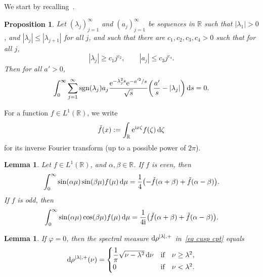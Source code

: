 \documentclass[pdftex]{sigma}%
\numberwithin{equation}{section}
\newtheorem{Lemma}[Theorem]{Lemma}
\newtheorem{Proposition}[Theorem]{Proposition}
 { \theoremstyle{definition}
\newtheorem{Definition}[Theorem]{Definition}
\newtheorem{Note}[Theorem]{Note}
\newtheorem{Example}[Theorem]{Example}
\newtheorem{Remark}[Theorem]{Remark} }
\DeclareMathOperator{\sgn}{sgn}
\newcommand{\R}{\mathbb{R}}
\begin{document}
We start by recalling~\cite[Proposition~5.1]{HW21a}.
\begin{Proposition}\label{prop vanish}
Let $(\lambda_j)_{j=1}^{\infty}$ and $(a_j)_{j=1}^{\infty}$ be sequences in $\R$ such that $|\lambda_1|>0$, and $|\lambda_j| \leq |\lambda_{j+1}|$ for all $j$, and such that
there are $c_1,c_2, c_3, c_4>0$ such that for all $j$,
\begin{equation*} %
|\lambda_j| \geq c_1 j^{c_2},\qquad |a_j| \leq c_3 j^{c_4}.
\end{equation*}
Then for all $a'>0$,
\begin{equation*}%
\int_0^{\infty} \sum_{j=1}^{\infty} \sgn(\lambda_j) a_j \frac{{\rm e}^{-\lambda_j^2 s} {\rm e}^{-a'^2/s}}{\sqrt{s}} \bigg(\frac{a'}{s} - |\lambda_j| \bigg) \, {\rm d}s = 0.
\end{equation*}
\end{Proposition}

For a function $f \in L^1(\R)$, we write
\[
\check{f}(x) := \int_{\R} {\rm e}^{{\rm i}x\zeta} f(\zeta)\, {\rm d}\zeta
\]
for its inverse Fourier transform (up to a possible power of $2\pi$).
\begin{Lemma}\label{lem IFT}
Let $f \in L^1(\R)$, and $\alpha,\beta \in \R$.
If $f$ is even, then
\[
\int_0^{\infty}\sin(\alpha\mu)\sin(\beta\mu)f(\mu)\,{\rm d}\mu=\frac14 \bigl( -\check{f}(\alpha+\beta)+\check{f}(\alpha-\beta) \bigr).
\]
If $f$ is odd, then
\[
\int_0^{\infty}\sin(\alpha\mu)\cos(\beta\mu)f(\mu)\,{\rm d}\mu=\frac1{4{\rm i}}\bigl( \check{f}(\alpha+\beta)+\check{f}(\alpha-\beta)\bigr).
\]
\end{Lemma}

\begin{Lemma}\label{lem rho cyl}
If $\varphi = 0$, then the spectral measure ${\rm d}\rho^{|\lambda|, +}$ in~\eqref{eq cusp cpt} equals
\[
{\rm d}\rho^{|\lambda|, +}(\nu)
=\begin{cases}\dfrac{1}{\pi}\sqrt{\nu-\lambda^2}\,{\rm d}\nu &\text{if\quad $\nu\ge\lambda^2$},
\\
0 & \text{if\quad $\nu<\lambda^2$}. \end{cases}
\]
\end{Lemma}
\end{document}
